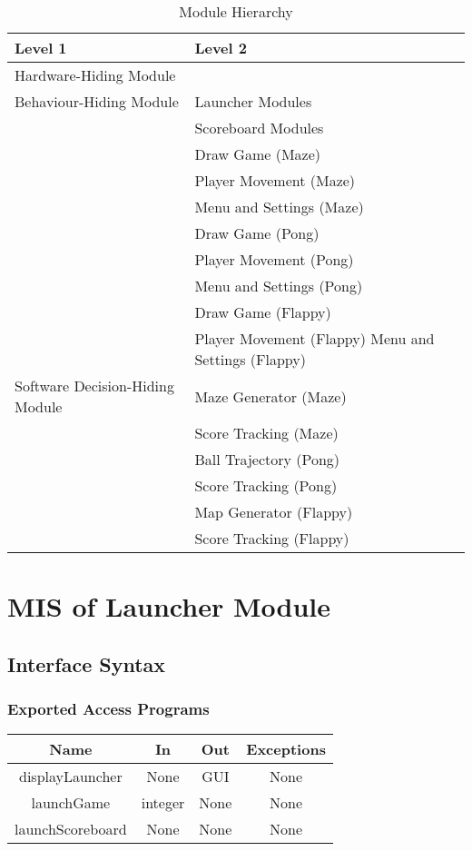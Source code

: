 \documentclass[12pt, titlepage]{article}
\begin{document}
\begin{table}[h!]
    \centering
    \begin{tabular}{p{} p{}}
    \toprule
    \textbf{Level 1} & \textbf{Level 2}\\
    \midrule
        {Hardware-Hiding Module} & ~ \\
    \midrule
        \multirow{1}{0.3\textwidth}{Behaviour-Hiding Module}
        & Launcher Modules\\
        & Scoreboard Modules\\
        & Draw Game (Maze)\\
        & Player Movement (Maze)\\
        & Menu and Settings (Maze)\\ 
        & Draw Game (Pong)\\
        & Player Movement (Pong)\\
        & Menu and Settings (Pong)\\ 
        & Draw Game (Flappy)\\
        & Player Movement (Flappy)
        Menu and Settings (Flappy)\\
    \midrule
        \multirow{1}{0.3\textwidth}{Software Decision-Hiding Module}
        & Maze Generator (Maze)\\
        & Score Tracking (Maze)\\ 
        & Ball Trajectory (Pong)\\
        & Score Tracking (Pong) \\ 
        & Map Generator (Flappy)\\
        & Score Tracking (Flappy)\\
    \bottomrule
\end{tabular}
\caption{Module Hierarchy}
\label{TblMH}
\end{table}

\section{MIS of Launcher Module}
		\subsection{Interface Syntax}
		\subsubsection{Exported Access Programs}
		\begin{tabular}[pos]{|c|c|c|c|}
			\hline
			\textbf{Name}& \textbf{In} & \textbf{Out} & \textbf{Exceptions} \\ \hline
			displayLauncher & None & GUI & None \\ \hline
			launchGame & integer & None & None \\ \hline
			launchScoreboard & None & None & None \\ \hline
		\end{tabular}
\end{document}
